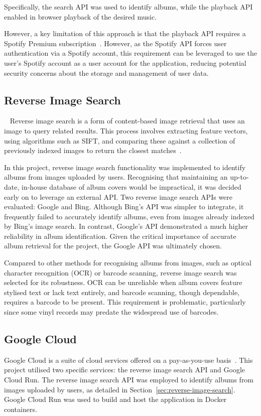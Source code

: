 Specifically, the search API was used to identify albums, while the playback API enabled in browser playback of the desired music.

However, a key limitation of this approach is that the playback API requires a Spotify Premium subscription~\cite{SpotifyPlaybackSDK}. However, as the Spotify API forces user authentication via a Spotify account, this requirement can be leveraged to use the user's Spotify account as a user account for the application, reducing potential security concerns about the storage and management of user data.

\subsection{Reverse Image Search}~\label{sec:reverse-image-search}
Reverse image search is a form of content-based image retrieval that uses an image to query related results. This process involves extracting feature vectors, using algorithms such as SIFT, and comparing these against a collection of previously indexed images to return the closest matches~\cite{Gaillard2017LargeSR}.

In this project, reverse image search functionality was implemented to identify albums from images uploaded by users. Recognising that maintaining an up-to-date, in-house database of album covers would be impractical, it was decided early on to leverage an external API. Two reverse image search APIs were evaluated: Google and Bing. Although Bing's API was simpler to integrate, it frequently failed to accurately identify albums, even from images already indexed by Bing's image search. In contrast, Google's API demonstrated a much higher reliability in album identification. Given the critical importance of accurate album retrieval for the project, the Google API was ultimately chosen.

Compared to other methods for recognising albums from images, such as optical character recognition (OCR) or barcode scanning, reverse image search was selected for its robustness. OCR can be unreliable when album covers feature stylised text or lack text entirely, and barcode scanning, though dependable, requires a barcode to be present. This requirement is problematic, particularly since some vinyl records may predate the widespread use of barcodes.

\subsection{Google Cloud}
Google Cloud is a suite of cloud services offered on a pay-as-you-use basis~\cite{GCP}. This project utilised two specific services: the reverse image search API and Google Cloud Run. The reverse image search API was employed to identify albums from images uploaded by users, as detailed in Section~\ref{sec:reverse-image-search}. Google Cloud Run was used to build and host the application in Docker containers.

